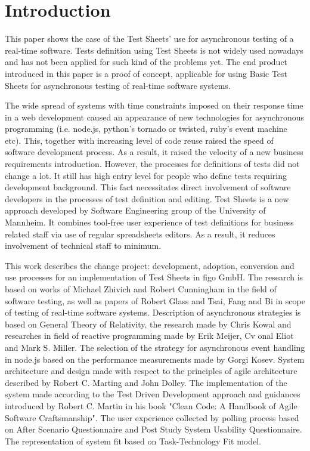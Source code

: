 \chapter{Introduction}
\label{chap:intro}
This paper shows the case of the Test Sheets' use for asynchronous testing of a real-time software. Tests definition using Test Sheets is not widely used nowadays and has not been applied for such kind of the problems yet.
The end product introduced in this paper is a proof of concept,  applicable for using Basic Test Sheets for asynchronous testing of real-time software systems.

The wide spread of systems with time constraints imposed on their response time in a web development caused an appearance of new technologies for asynchronous programming (i.e. node.js, python's tornado or twisted, ruby's event machine etc). 
This, together with increasing level of code reuse raised the speed of software development process.
As a result, it raised the velocity of a new business requirements introduction.
However, the processes for definitions of tests did not change a lot. 
It still has high entry level for people who define tests requiring development background.
This fact necessitates direct involvement of software developers in the processes of test definition and editing.
Test Sheets is a new approach developed by Software Engineering group of the University of Mannheim. 
It combines  tool-free user experience of test definitions for business related staff via use of regular spreadsheets editors.
As a result, it reduces involvement of technical staff to minimum.


This work describes the change project: development, adoption, conversion and use processes for an implementation of Test Sheets in figo GmbH. The research is based on works of Michael Zhivich and Robert Cunningham in the field of software testing, as well as papers of Robert Glass and Tsai, Fang  and Bi in scope of testing of real-time software systems.
Description of asynchronous strategies is based on General Theory of Relativity, the research made by Chris Kowal and researches in field of reactive programming made by Erik Meijer, Cv
onal Eliot and Mark S. Miller. 
The selection of the strategy for asynchronous event handling in node.js based on the performance measurements made by Gorgi Kosev. 
System  architecture and design made with respect to the principles of agile architecture described by Robert  C. Marting and John Dolley. 
The implementation of the system made according to the Test Driven Development approach and guidances introduced by Robert C. Martin in his book "Clean Code: A Handbook of Agile Software Craftsmanship".
The user experience collected by polling process based on After Scenario Questionnaire and Post Study System Usability Questionnaire.
The representation of system fit based on Task-Technology Fit model.

